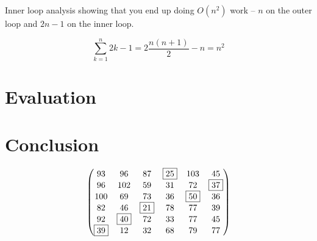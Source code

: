 \documentclass{article}
\begin{document}
Inner loop analysis showing that you end up doing $O(n^2)$ work -- $n$ on the outer loop and $2n - 1$ on the inner loop.

\begin{equation}
	\sum_{k = 1}^{n} 2k - 1 = 2 \frac{n (n + 1)}{2} - n = n^2
\end{equation}

\section{Evaluation}

\section{Conclusion}
\begin{equation}
\begin{pmatrix}
93 & 96 & 87 & \fbox{25} & 103 & 45\\
96 & 102 & 59 & 31 & 72 & \fbox{37}\\
100 & 69 & 73 & 36 & \fbox{50} & 36\\
82 & 46 & \fbox{21} & 78 & 77 & 39\\
92 & \fbox{40} & 72 & 33 & 77 & 45\\
\fbox{39} & 12 & 32 & 68 & 79 & 77
\end{pmatrix}
\end{equation}
\end{document}
